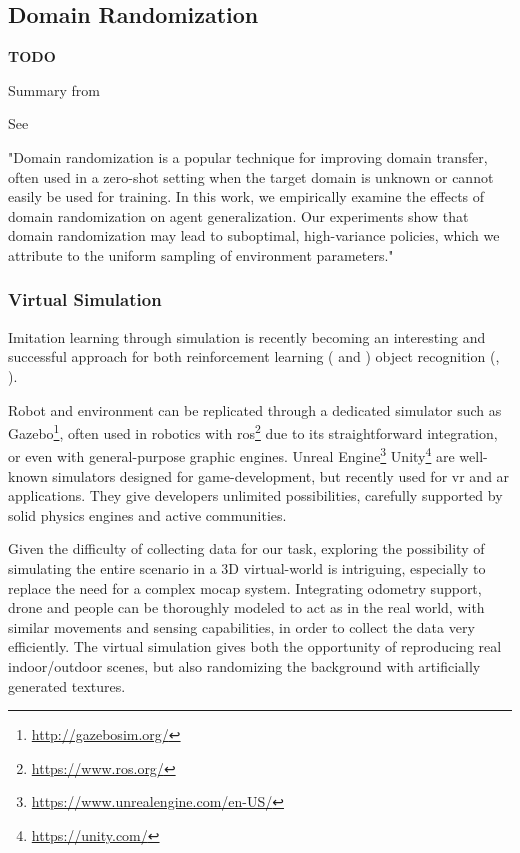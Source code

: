 \subsection{Domain Randomization}
\label{subsec:domain-randomization}

\textbf{TODO}

Summary from \cite{mehta2019active}

See \cite{weng2019DR_explanation}
 
"Domain randomization is a popular technique for improving domain transfer, often used in a zero-shot setting when the target domain is unknown or cannot easily be used for training. In this work, we empirically examine the effects of domain randomization on agent generalization. Our experiments show that domain randomization may lead to suboptimal, high-variance policies, which we attribute to the uniform sampling of environment parameters."


\subsubsection{Virtual Simulation}
\label{subsec:virtual-simulation}

Imitation learning through simulation is recently becoming an interesting and successful approach for both reinforcement learning (\cite{imitation_learning_survey} and \cite{imitation_learning_3d_navigation}) object recognition (\cite{tobin2017domain}, \cite{weng2019DR}).

Robot and environment can be replicated through a dedicated simulator such as Gazebo\footnote{\url{http://gazebosim.org/}}, often used in robotics with \gls{ros}\footnote{\url{https://www.ros.org/}} due to its straightforward integration, or even with general-purpose graphic engines. Unreal Engine\footnote{\url{https://www.unrealengine.com/en-US/}} Unity\footnote{\url{https://unity.com/}} are well-known simulators designed for game-development, but recently used for \gls{vr} and \gls{ar} applications. They give developers unlimited possibilities, carefully supported by solid physics engines and active communities.

\medskip

Given the difficulty of collecting data for our task, exploring the possibility of simulating the entire scenario in a 3D virtual-world is intriguing, especially to replace the need for a complex \gls{mocap} system. Integrating odometry support, drone and people can be thoroughly modeled to act as in the real world, with similar movements and sensing capabilities, in order to collect the data very efficiently. The virtual simulation gives both the opportunity of reproducing real indoor/outdoor scenes, but also randomizing the background with artificially generated textures.

